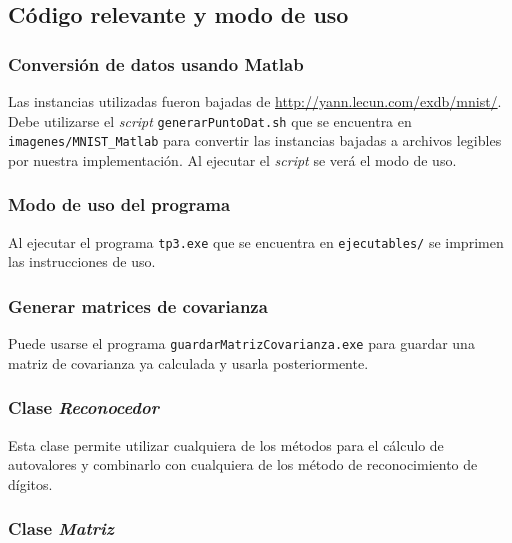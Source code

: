 \subsection{C\'odigo relevante y modo de uso}

	\subsubsection{Conversi\'on de datos usando Matlab}
		Las instancias utilizadas fueron bajadas de \url{http://yann.lecun.com/exdb/mnist/}.
		Debe utilizarse el \textit{script} \texttt{generarPuntoDat.sh} que se
		encuentra en \texttt{imagenes/MNIST\_Matlab}
		para convertir las instancias bajadas a archivos legibles por
		nuestra implementaci\'on. Al ejecutar el \textit{script} se
		ver\'a el modo de uso.

	\subsubsection{Modo de uso del programa}
		Al ejecutar el programa \texttt{tp3.exe} que se encuentra
		en \texttt{ejecutables/} se imprimen las instrucciones de uso.

	\subsubsection{Generar matrices de covarianza}
		Puede usarse el programa \texttt{guardarMatrizCovarianza.exe}
		para guardar una matriz de covarianza ya calculada y usarla
		posteriormente.

	\subsubsection{Clase \textit{Reconocedor}}
		Esta clase permite utilizar cualquiera de los m\'etodos para el c\'alculo
		de autovalores y combinarlo con cualquiera de los m\'etodo de reconocimiento
		de d\'igitos.
		
		

	\subsubsection{Clase \textit{Matriz}}
		
		
